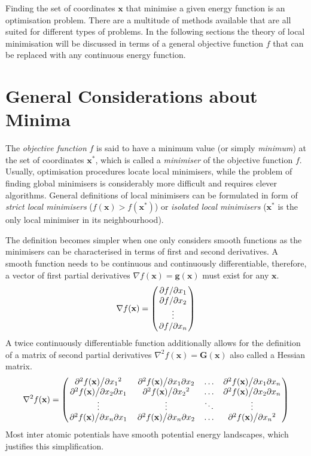Finding the set of coordinates $\mathbf{x}$ that minimise a given energy
function is an optimisation problem. There are a multitude of methods available
that are all suited for different types of problems. In the following sections
the theory of local minimisation will be discussed in terms of a general
objective function $f$ that can be replaced with any continuous energy
function.

\section{General Considerations about Minima}
\label{sec:GeneralRemarksAboutMinima}

The \textit{objective function} $f$ is said to have a minimum value (or simply
\textit{minimum}) at the set of coordinates $\mathbf{x^*}$, which is called a
\textit{minimiser} of the objective function $f$. Usually, optimisation
procedures locate local minimisers, while the problem of finding global
minimisers is considerably more difficult and requires clever algorithms.
General definitions of local minimisers can be formulated in form of
\textit{strict local minimisers} ($f(\mathbf{x})>f(\mathbf{x^*})$) or
\textit{isolated local minimisers} ($\mathbf{x^*}$ is the only local minimiser
in its neighbourhood).

The definition becomes simpler when one only considers smooth functions as the
minimisers can be characterised in terms of first and second derivatives. A
smooth function needs to be continuous and continuously differentiable,
therefore, a vector of first partial derivatives $\nabla
f(\mathbf{x})=\mathbf{g}(\mathbf{x})$ must exist for any $\mathbf{x}$.
%
\begin{equation}
    \nabla f(\mathbf{x})=
    \begin{pmatrix}
        \pdv*{f}{x_1}\\
        \pdv*{f}{x_2}\\
        \vdots\\
        \pdv*{f}{x_n}
    \end{pmatrix}
\end{equation}
%
A twice continuously differentiable function additionally allows for the
definition of a matrix of second partial derivatives $\nabla^2
f(\mathbf{x})=\mathbf{G}(\mathbf{x})$ also called a Hessian matrix.
%
\begin{equation}
    \nabla^2 f(\mathbf{x})=
    \begin{pmatrix}
        \pdv*[2]{f(\mathbf{x})}{{x_1}} & \pdv*{f(\mathbf{x})}{x_1}{x_2} & \ldots & \pdv*{f(\mathbf{x})}{x_1}{x_{n}}\\
        \pdv*{f(\mathbf{x})}{x_2}{x_1} & \pdv*[2]{f(\mathbf{x})}{{x_2}} & \ldots & \pdv*{f(\mathbf{x})}{x_2}{x_{n}}\\
        \vdots & \vdots & \ddots & \vdots\\
        \pdv*{f(\mathbf{x})}{x_{n}}{x_1} & \pdv*{f(\mathbf{x})}{x_{n}}{x_2} & \ldots & \pdv*[2]{f(\mathbf{x})}{{x_{n}}}
    \end{pmatrix}
\end{equation}
%
Most inter atomic potentials have smooth potential energy landscapes, which
justifies this simplification. 

